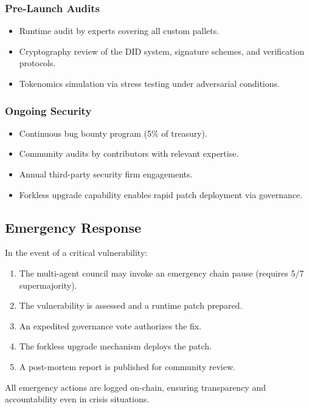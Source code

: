 \subsubsection{Pre-Launch Audits}

\begin{itemize}[nosep]
    \item Runtime audit by \substrate{} experts covering all custom pallets.
    \item Cryptography review of the DID system, signature schemes, and verification protocols.
    \item Tokenomics simulation via stress testing under adversarial conditions.
\end{itemize}

\subsubsection{Ongoing Security}

\begin{itemize}[nosep]
    \item Continuous bug bounty program (5\% of treasury).
    \item Community audits by contributors with relevant expertise.
    \item Annual third-party security firm engagements.
    \item Forkless upgrade capability enables rapid patch deployment via governance.
\end{itemize}

\subsection{Emergency Response}

In the event of a critical vulnerability:

\begin{enumerate}[nosep]
    \item The multi-agent council may invoke an emergency chain pause (requires 5/7 supermajority).
    \item The vulnerability is assessed and a runtime patch prepared.
    \item An expedited governance vote authorizes the fix.
    \item The forkless upgrade mechanism deploys the patch.
    \item A post-mortem report is published for community review.
\end{enumerate}

\noindent All emergency actions are logged on-chain, ensuring transparency and accountability even in crisis situations.
